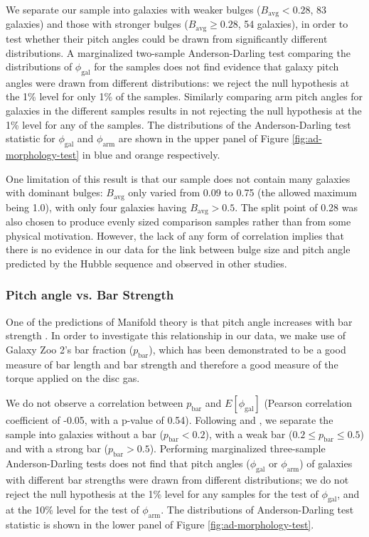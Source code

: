 We separate our sample into galaxies with weaker bulges ($B_\mathrm{avg} < 0.28$, 83 galaxies) and those with stronger bulges ($B_\mathrm{avg} \ge 0.28$, 54 galaxies), in order to test whether their pitch angles could be drawn from significantly different distributions. A marginalized two-sample Anderson-Darling test comparing the distributions of $\phi_\mathrm{gal}$ for the samples does not find evidence that galaxy pitch angles were drawn from different distributions: we reject the null hypothesis at the 1\% level for only 1\% of the samples. Similarly comparing arm pitch angles for galaxies in the different samples results in not rejecting the null hypothesis at the 1\% level for any of the samples. The distributions of the Anderson-Darling test statistic for $\phi_\mathrm{gal}$ and $\phi_\mathrm{arm}$ are shown in the upper panel of Figure \ref{fig:ad-morphology-test} in blue and orange respectively.

One limitation of this result is that our sample does not contain many galaxies with dominant bulges: $B_\mathrm{avg}$ only varied from 0.09 to 0.75 (the allowed maximum being 1.0), with only four galaxies having $B_\mathrm{avg} > 0.5$. The split point of 0.28 was also chosen to produce evenly sized comparison samples rather than from some physical motivation. However, the lack of any form of correlation implies that there is no evidence in our data for the link between bulge size and pitch angle predicted by the Hubble sequence and observed in other studies.

\subsubsection{Pitch angle vs. Bar Strength}

One of the predictions of Manifold theory is that pitch angle increases with bar strength \citep{2009MNRAS.400.1706A}. In order to investigate this relationship in our data, we make use of Galaxy Zoo 2's bar fraction ($p_\mathrm{bar}$), which has been demonstrated to be a good measure of bar length \citep{Willett2013:1308.3496v2} and bar strength \citep{2012MNRAS.423.1485S,2012MNRAS.424.2180M,2018MNRAS.473.4731K} and therefore a good measure of the torque applied on the disc gas.

We do not observe a correlation between $p_\mathrm{bar}$ and $E[\phi_\mathrm{gal}]$ (Pearson correlation coefficient of -0.05, with a p-value of 0.54). Following \citet{2012MNRAS.424.2180M} and \citet{2012MNRAS.423.1485S}, we separate the sample into galaxies without a bar ($p_\mathrm{bar} < 0.2$), with a weak bar ($0.2 \le p_\mathrm{bar} \le 0.5$) and with a strong bar ($p_\mathrm{bar} > 0.5$). Performing marginalized three-sample Anderson-Darling tests does not find that pitch angles ($\phi_\mathrm{gal}$ or $\phi_\mathrm{arm}$) of galaxies with different bar strengths were drawn from different distributions; we do not reject the null hypothesis at the 1\% level for any samples for the test of $\phi_\mathrm{gal}$, and at the 10\% level for the test of $\phi_\mathrm{arm}$. The distributions of Anderson-Darling test statistic is shown in the lower panel of Figure \ref{fig:ad-morphology-test}.

